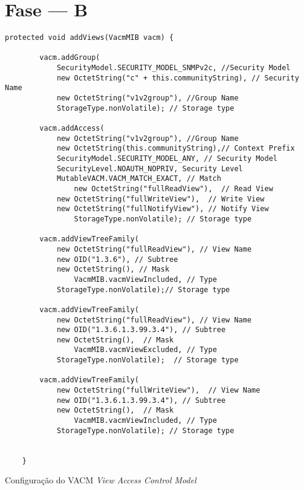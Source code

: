 \section{Fase --- B}








\begin{center}
 	 	\begin{verbatim}
protected void addViews(VacmMIB vacm) {

		vacm.addGroup(
			SecurityModel.SECURITY_MODEL_SNMPv2c, //Security Model
			new OctetString("c" + this.communityString), // Security Name
			new OctetString("v1v2group"), //Group Name
			StorageType.nonVolatile); // Storage type

		vacm.addAccess(
			new OctetString("v1v2group"), //Group Name
			new OctetString(this.communityString),// Context Prefix
			SecurityModel.SECURITY_MODEL_ANY, // Security Model
			SecurityLevel.NOAUTH_NOPRIV, Security Level
			MutableVACM.VACM_MATCH_EXACT, // Match
				new OctetString("fullReadView"),  // Read View
			new OctetString("fullWriteView"),  // Write View
			new OctetString("fullNotifyView"), // Notify View
				StorageType.nonVolatile); // Storage type

		vacm.addViewTreeFamily(
			new OctetString("fullReadView"), // View Name 
			new OID("1.3.6"), // Subtree
			new OctetString(), // Mask
				VacmMIB.vacmViewIncluded, // Type 
			StorageType.nonVolatile);// Storage type
		
		vacm.addViewTreeFamily(
			new OctetString("fullReadView"), // View Name 
			new OID("1.3.6.1.3.99.3.4"), // Subtree
			new OctetString(),  // Mask
				VacmMIB.vacmViewExcluded, // Type 
			StorageType.nonVolatile);  // Storage type

		vacm.addViewTreeFamily(
			new OctetString("fullWriteView"),  // View Name 
			new OID("1.3.6.1.3.99.3.4"), // Subtree
			new OctetString(),  // Mask
				VacmMIB.vacmViewIncluded, // Type 
			StorageType.nonVolatile); // Storage type


	}
\end{verbatim}
 	\captionsetup{type=figure, width=0.8\linewidth}
	\caption{Configuração do VACM \emph{View Access Control Model}}
\label{fig:faseb:} 
\end{center}

